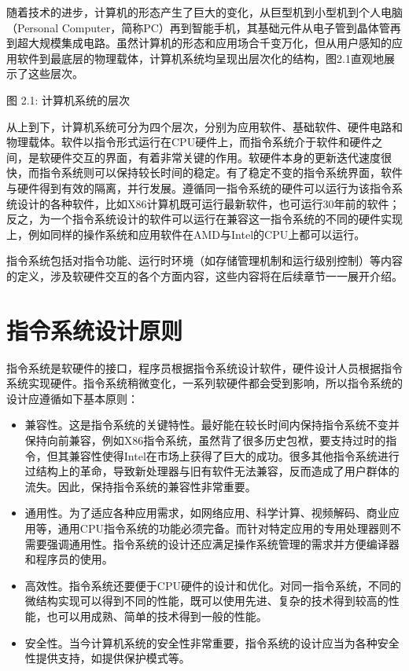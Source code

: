 \documentclass[]{ctexbook}
\begin{document}
随着技术的进步，计算机的形态产生了巨大的变化，从巨型机到小型机到个人电脑（Personal Computer，简称PC）再到智能手机，其基础元件从电子管到晶体管再到超大规模集成电路。虽然计算机的形态和应用场合千变万化，但从用户感知的应用软件到最底层的物理载体，计算机系统均呈现出层次化的结构，图2.1直观地展示了这些层次。

图 2.1: 计算机系统的层次

从上到下，计算机系统可分为四个层次，分别为应用软件、基础软件、硬件电路和物理载体。软件以指令形式运行在CPU硬件上，而指令系统介于软件和硬件之间，是软硬件交互的界面，有着非常关键的作用。软硬件本身的更新迭代速度很快，而指令系统则可以保持较长时间的稳定。有了稳定不变的指令系统界面，软件与硬件得到有效的隔离，并行发展。遵循同一指令系统的硬件可以运行为该指令系统设计的各种软件，比如X86计算机既可运行最新软件，也可运行30年前的软件；反之，为一个指令系统设计的软件可以运行在兼容这一指令系统的不同的硬件实现上，例如同样的操作系统和应用软件在AMD与Intel的CPU上都可以运行。

指令系统包括对指令功能、运行时环境（如存储管理机制和运行级别控制）等内容的定义，涉及软硬件交互的各个方面内容，这些内容将在后续章节一一展开介绍。

\hypertarget{ux6307ux4ee4ux7cfbux7edfux8bbeux8ba1ux539fux5219}{%
\section{指令系统设计原则}\label{ux6307ux4ee4ux7cfbux7edfux8bbeux8ba1ux539fux5219}}

指令系统是软硬件的接口，程序员根据指令系统设计软件，硬件设计人员根据指令系统实现硬件。指令系统稍微变化，一系列软硬件都会受到影响，所以指令系统的设计应遵循如下基本原则：

\begin{itemize}
\item
  兼容性。这是指令系统的关键特性。最好能在较长时间内保持指令系统不变并保持向前兼容，例如X86指令系统，虽然背了很多历史包袱，要支持过时的指令，但其兼容性使得Intel在市场上获得了巨大的成功。很多其他指令系统进行过结构上的革命，导致新处理器与旧有软件无法兼容，反而造成了用户群体的流失。因此，保持指令系统的兼容性非常重要。
\item
  通用性。为了适应各种应用需求，如网络应用、科学计算、视频解码、商业应用等，通用CPU指令系统的功能必须完备。而针对特定应用的专用处理器则不需要强调通用性。指令系统的设计还应满足操作系统管理的需求并方便编译器和程序员的使用。
\item
  高效性。指令系统还要便于CPU硬件的设计和优化。对同一指令系统，不同的微结构实现可以得到不同的性能，既可以使用先进、复杂的技术得到较高的性能，也可以用成熟、简单的技术得到一般的性能。
\item
  安全性。当今计算机系统的安全性非常重要，指令系统的设计应当为各种安全性提供支持，如提供保护模式等。
\end{itemize}
\end{document}
